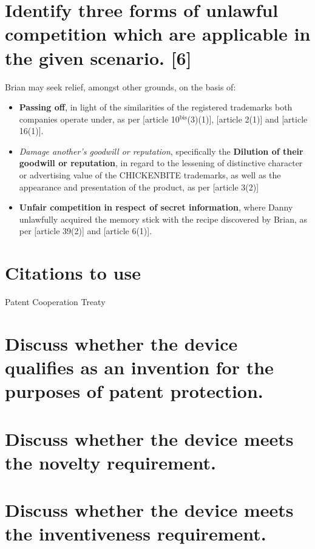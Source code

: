 \documentclass[11pt]{article}
\begin{document}
\section{Identify three forms of unlawful competition which are applicable in the given scenario. [6]}
\label{sec:org5cd25b0}
Brian may seek relief, amongst other grounds, on the basis of:
\begin{itemize}
\item \textbf{Passing off}, in light of the similarities of the registered trademarks both companies operate under, as per [article
10\(^{\text{bis}}\)(3)(1)]\cite{wipo83_paris_conve_protect_ip}, [article
2(1)]\cite{wipo96_model_provi_unfair_comp} and [article 16(1)]\cite{wto17_trips}.
\item \emph{Damage another's goodwill or reputation}, specifically the \textbf{Dilution of their
goodwill or reputation}, in regard to the lessening of distinctive character
or advertising value of the CHICKENBITE trademarks, as well as the appearance and
presentation of the product, as per [article 3(2)]\cite{wipo96_model_provi_unfair_comp}
\item \textbf{Unfair competition in respect of secret information}, where Danny unlawfully
acquired the memory stick with the recipe discovered by Brian, as per
[article 39(2)]\cite{wto17_trips} and [article 6(1)]\cite{wipo96_model_provi_unfair_comp}.
\end{itemize}
\section{Citations to use}
\label{sec:org21f3f3e}
\cite{wto17_trips,wipo83_paris_conve_protect_ip}

Patent Cooperation Treaty \cite{wipo70_pct}

\section{Discuss whether the device qualifies as an invention for the purposes of patent protection.}
\label{sec:orgca527b2}
\section{Discuss whether the device meets the novelty requirement.}
\label{sec:orgb39d11b}
\section{Discuss whether the device meets the inventiveness requirement.}
\label{sec:orgf65e0eb}

\printbibliography
\end{document}
